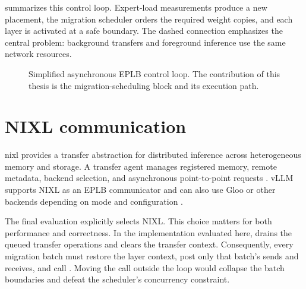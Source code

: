  summarizes this control loop. Expert-load measurements
produce a new placement, the migration scheduler orders the required weight
copies, and each layer is activated at a safe boundary. The dashed connection
emphasizes the central problem: background transfers and foreground inference
use the same network resources.

\begin{figure}[t]
  \centering
  \caption{Simplified asynchronous EPLB control loop. The contribution of this
  thesis is the migration-scheduling block and its execution path.}
  \label{fig:eplb-loop}
\end{figure}

\section{NIXL communication}

\gls{nixl} provides a transfer abstraction for distributed inference across
heterogeneous memory and storage. A transfer agent manages registered memory,
remote metadata, backend selection, and asynchronous point-to-point requests
\cite{nixlguide}. vLLM supports NIXL as an EPLB communicator and can also use
Gloo or other backends depending on mode and configuration
\cite{vllmconfigdocs}.

The final evaluation explicitly selects NIXL. This choice matters for both
performance and correctness. In the implementation evaluated here,
 drains the queued transfer operations and clears the transfer
context. Consequently, every migration batch must restore the layer context,
post only that batch's sends and receives, and call . Moving
the call outside the loop would collapse the batch boundaries and defeat the
scheduler's concurrency constraint.
